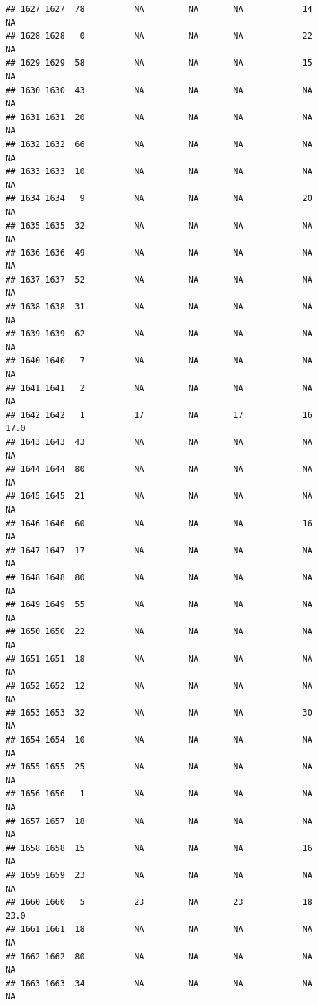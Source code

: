 \documentclass[man]{apa6}
\begin{document}
\begin{verbatim}
## 1627 1627  78          NA         NA       NA            14       NA
## 1628 1628   0          NA         NA       NA            22       NA
## 1629 1629  58          NA         NA       NA            15       NA
## 1630 1630  43          NA         NA       NA            NA       NA
## 1631 1631  20          NA         NA       NA            NA       NA
## 1632 1632  66          NA         NA       NA            NA       NA
## 1633 1633  10          NA         NA       NA            NA       NA
## 1634 1634   9          NA         NA       NA            20       NA
## 1635 1635  32          NA         NA       NA            NA       NA
## 1636 1636  49          NA         NA       NA            NA       NA
## 1637 1637  52          NA         NA       NA            NA       NA
## 1638 1638  31          NA         NA       NA            NA       NA
## 1639 1639  62          NA         NA       NA            NA       NA
## 1640 1640   7          NA         NA       NA            NA       NA
## 1641 1641   2          NA         NA       NA            NA       NA
## 1642 1642   1          17         NA       17            16     17.0
## 1643 1643  43          NA         NA       NA            NA       NA
## 1644 1644  80          NA         NA       NA            NA       NA
## 1645 1645  21          NA         NA       NA            NA       NA
## 1646 1646  60          NA         NA       NA            16       NA
## 1647 1647  17          NA         NA       NA            NA       NA
## 1648 1648  80          NA         NA       NA            NA       NA
## 1649 1649  55          NA         NA       NA            NA       NA
## 1650 1650  22          NA         NA       NA            NA       NA
## 1651 1651  18          NA         NA       NA            NA       NA
## 1652 1652  12          NA         NA       NA            NA       NA
## 1653 1653  32          NA         NA       NA            30       NA
## 1654 1654  10          NA         NA       NA            NA       NA
## 1655 1655  25          NA         NA       NA            NA       NA
## 1656 1656   1          NA         NA       NA            NA       NA
## 1657 1657  18          NA         NA       NA            NA       NA
## 1658 1658  15          NA         NA       NA            16       NA
## 1659 1659  23          NA         NA       NA            NA       NA
## 1660 1660   5          23         NA       23            18     23.0
## 1661 1661  18          NA         NA       NA            NA       NA
## 1662 1662  80          NA         NA       NA            NA       NA
## 1663 1663  34          NA         NA       NA            NA       NA

\end{verbatim}
\end{document}

